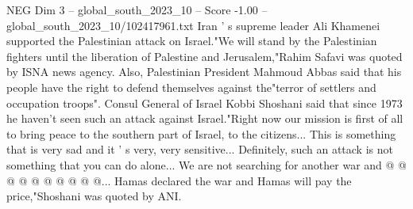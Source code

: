 \begin{textsample}{NEG Dim 3 – global\_south\_2023\_10 – Score -1.00 – global\_south\_2023\_10/102417961.txt}
Iran ' s supreme leader Ali Khamenei supported the Palestinian attack on Israel."We will stand by the Palestinian fighters until the liberation of Palestine and Jerusalem,"Rahim Safavi was quoted by ISNA news agency.
Also, Palestinian President Mahmoud Abbas said that his people have the right to defend themselves against the"terror of settlers and occupation troops".
Consul General of Israel Kobbi Shoshani said that since 1973 he haven't seen such an attack against Israel."Right now our mission is first of all to bring peace to the southern part of Israel, to the citizens...
This is something that is very sad and it ' s very, very sensitive...
Definitely, such an attack is not something that you can do alone...
We are not searching for another war and @ @ @ @ @ @ @ @ @ @...
Hamas declared the war and Hamas will pay the price,"Shoshani was quoted by ANI.

\end{textsample}
